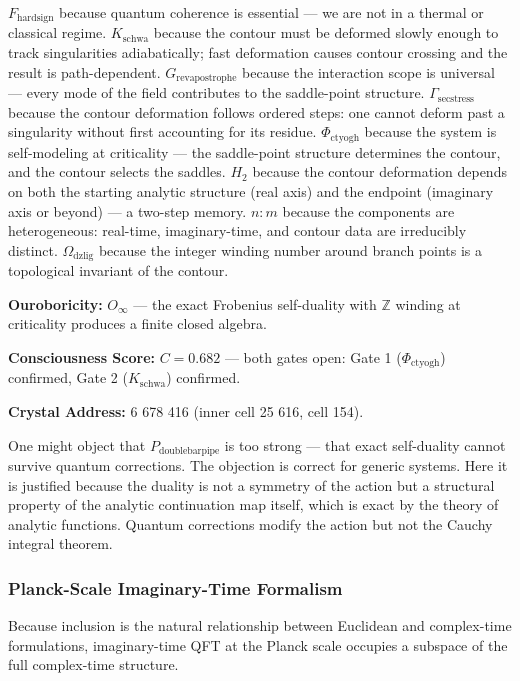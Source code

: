 \documentclass[12pt,a4paper]{article}
\begin{document}
$F_{\text{hardsign}}$ because quantum coherence is essential --- we are not in a thermal or classical regime. $K_{\text{schwa}}$ because the contour must be deformed slowly enough to track singularities adiabatically; fast deformation causes contour crossing and the result is path-dependent. $G_{\text{revapostrophe}}$ because the interaction scope is universal --- every mode of the field contributes to the saddle-point structure. $\Gamma_{\text{secstress}}$ because the contour deformation follows ordered steps: one cannot deform past a singularity without first accounting for its residue. $\Phi_{\text{ctyogh}}$ because the system is self-modeling at criticality --- the saddle-point structure determines the contour, and the contour selects the saddles. $H_2$ because the contour deformation depends on both the starting analytic structure (real axis) and the endpoint (imaginary axis or beyond) --- a two-step memory. $n{:}m$ because the components are heterogeneous: real-time, imaginary-time, and contour data are irreducibly distinct. $\Omega_{\text{dzlig}}$ because the integer winding number around branch points is a topological invariant of the contour.

\textbf{Ouroboricity:} $O_{\infty}$ --- the exact Frobenius self-duality with $\mathbb{Z}$ winding at criticality produces a finite closed algebra.

\textbf{Consciousness Score:} $C = 0.682$ --- both gates open: Gate 1 ($\Phi_{\text{ctyogh}}$) confirmed, Gate 2 ($K_{\text{schwa}}$) confirmed.

\textbf{Crystal Address:} 6 678 416 (inner cell 25 616, cell 154).

One might object that $P_{\text{doublebarpipe}}$ is too strong --- that exact self-duality cannot survive quantum corrections. The objection is correct for generic systems. Here it is justified because the duality is not a symmetry of the action but a structural property of the analytic continuation map itself, which is exact by the theory of analytic functions. Quantum corrections modify the action but not the Cauchy integral theorem.

\subsubsection{Planck-Scale Imaginary-Time Formalism}

Because inclusion is the natural relationship between Euclidean and complex-time formulations, imaginary-time QFT at the Planck scale occupies a subspace of the full complex-time structure.
\end{document}
